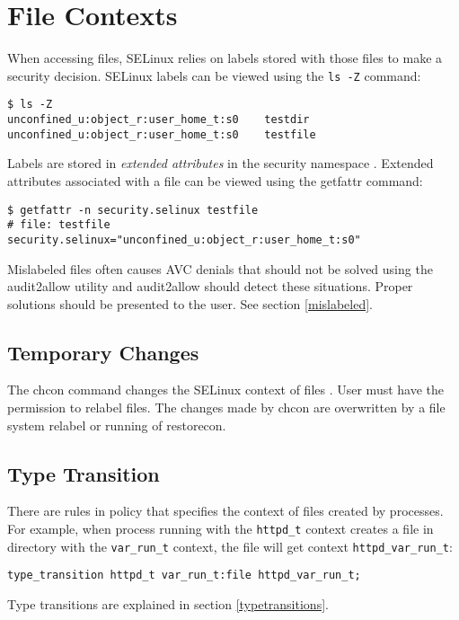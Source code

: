 \section{File Contexts}
\label{filecontexts}
When accessing files, SELinux relies on labels stored with those files to make a
security decision. SELinux labels can be viewed using the \texttt{ls -Z}
command:
\begin{lstlisting}
$ ls -Z
unconfined_u:object_r:user_home_t:s0    testdir
unconfined_u:object_r:user_home_t:s0    testfile
\end{lstlisting}
Labels are stored in \emph{extended attributes} in the security namespace
\cite{xattrman}. Extended attributes associated with a file can be viewed using
the getfattr command:
\begin{lstlisting}
$ getfattr -n security.selinux testfile
# file: testfile
security.selinux="unconfined_u:object_r:user_home_t:s0"
\end{lstlisting}
Mislabeled files often causes AVC denials that should not be solved using the
audit2allow utility and audit2allow should detect these situations. Proper
solutions should be presented to the user. See section \ref{mislabeled}.

\subsection{Temporary Changes}
The chcon command changes the SELinux context of files \cite{selinuxguide}. User
must have the permission to relabel files. The changes made by chcon are
overwritten by a file system relabel or running of restorecon.

\subsection{Type Transition}
There are rules in policy that specifies the context of files created by
processes. For example, when process running with the \texttt{httpd\_t} context
creates a file in directory with the \texttt{var\_run\_t} context, the file will
get context \texttt{httpd\_var\_run\_t}:
\begin{lstlisting}[language=te]
type_transition httpd_t var_run_t:file httpd_var_run_t;
\end{lstlisting}
Type transitions are explained in section \ref{typetransitions}.


